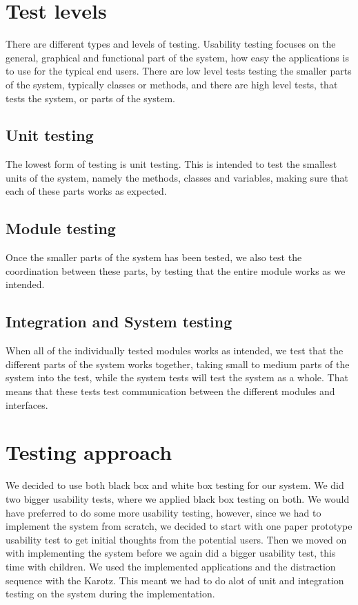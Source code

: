 \section{Test levels}
There are different types and levels of testing. Usability testing focuses on the 
general, graphical and functional part of the system, how easy the applications is 
to use for the typical end users. There are low level tests testing the smaller parts 
of the system, typically classes or methods, and there are high level tests, that 
tests the system, or parts of the system.

\subsection{Unit testing}
The lowest form of testing is unit testing. This is intended to test the smallest 
units of the system, namely the methods, classes and variables, making sure that each 
of these parts works as expected. 

\subsection{Module testing}
Once the smaller parts of the system has been tested, we also test the coordination 
between these parts, by testing that the entire module works as we intended.

\subsection{Integration and System testing}
When all of the individually tested modules works as intended, we test 
that the different parts of the system works together, taking 
small to medium parts of the system into the test, while the system tests will test the 
system as a whole. That means that these tests test communication between
the different modules and interfaces.

\section{Testing approach}	
We decided to use both black box and white box testing for our system. We did 
two bigger usability tests, where we applied black box testing on both. We would have preferred to
do some more usability testing, however, since we had to implement the system from scratch, we decided
to start with one paper prototype usability test to get initial thoughts from the potential users. Then 
we moved on with implementing the system before we again did a bigger usability test, this 
time  with children. We used the implemented applications and the distraction sequence with the Karotz.
This meant we had to do alot of unit and integration testing on the system during the implementation. 

